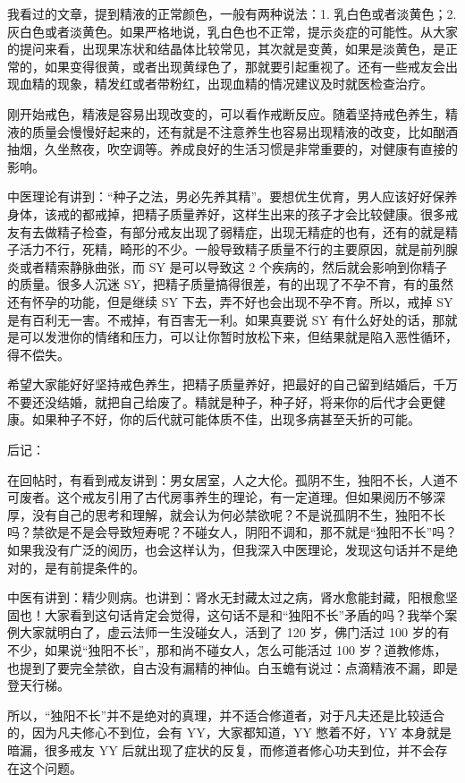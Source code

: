 \documentclass[fontset=founder]{ctexart}
\begin{document}
我看过的文章，提到精液的正常颜色，一般有两种说法：1. 乳白色或者淡黄色；2. 灰白色或者淡黄色。如果严格地说，乳白色也不正常，提示炎症的可能性。从大家的提问来看，出现果冻状和结晶体比较常见，其次就是变黄，如果是淡黄色，是正常的，如果变得很黄，或者出现黄绿色了，那就要引起重视了。还有一些戒友会出现血精的现象，精发红或者带粉红，出现血精的情况建议及时就医检查治疗。

刚开始戒色，精液是容易出现改变的，可以看作戒断反应。随着坚持戒色养生，精液的质量会慢慢好起来的，还有就是不注意养生也容易出现精液的改变，比如酗酒抽烟，久坐熬夜，吹空调等。养成良好的生活习惯是非常重要的，对健康有直接的影响。

中医理论有讲到：“种子之法，男必先养其精”。要想优生优育，男人应该好好保养身体，该戒的都戒掉，把精子质量养好，这样生出来的孩子才会比较健康。很多戒友有去做精子检查，有部分戒友出现了弱精症，出现无精症的也有，还有的就是精子活力不行，死精，畸形的不少。一般导致精子质量不行的主要原因，就是前列腺炎或者精索静脉曲张，而 SY 是可以导致这 2 个疾病的，然后就会影响到你精子的质量。很多人沉迷 SY，把精子质量搞得很差，有的出现了不孕不育，有的虽然还有怀孕的功能，但是继续 SY 下去，弄不好也会出现不孕不育。所以，戒掉 SY 是有百利无一害。不戒掉，有百害无一利。如果真要说 SY 有什么好处的话，那就是可以发泄你的情绪和压力，可以让你暂时放松下来，但结果就是陷入恶性循环，得不偿失。

希望大家能好好坚持戒色养生，把精子质量养好，把最好的自己留到结婚后，千万不要还没结婚，就把自己给废了。精就是种子，种子好，将来你的后代才会更健康。如果种子不好，你的后代就可能体质不佳，出现多病甚至夭折的可能。

后记：

在回帖时，有看到戒友讲到：男女居室，人之大伦。孤阴不生，独阳不长，人道不可废者。这个戒友引用了古代房事养生的理论，有一定道理。但如果阅历不够深厚，没有自己的思考和理解，就会认为何必禁欲呢？不是说孤阴不生，独阳不长吗？禁欲是不是会导致短寿呢？不碰女人，阴阳不调和，那不就是“独阳不长”吗？如果我没有广泛的阅历，也会这样认为，但我深入中医理论，发现这句话并不是绝对的，是有前提条件的。

中医有讲到：精少则病。也讲到：肾水无封藏太过之病，肾水愈能封藏，阳根愈坚固也！大家看到这句话肯定会觉得，这句话不是和“独阳不长”矛盾的吗？我举个案例大家就明白了，虚云法师一生没碰女人，活到了 120 岁，佛门活过 100 岁的有不少，如果说“独阳不长”，那和尚不碰女人，怎么可能活过 100 岁？道教修炼，也提到了要完全禁欲，自古没有漏精的神仙。白玉蟾有说过：点滴精液不漏，即是登天行梯。

所以，“独阳不长”并不是绝对的真理，并不适合修道者，对于凡夫还是比较适合的，因为凡夫修心不到位，会有 YY，大家都知道，YY 憋着不好，YY 本身就是暗漏，很多戒友 YY 后就出现了症状的反复，而修道者修心功夫到位，并不会存在这个问题。
\end{document}
